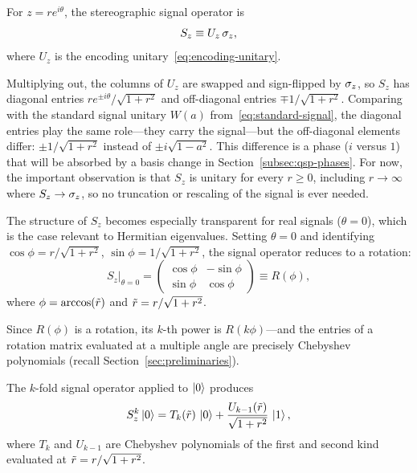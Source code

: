 \begin{definition}
	\label{def:signal-operator}
	For $z = re^{i\theta}$, the stereographic signal operator is
	\begin{equation}
		S_z \equiv U_z\,\sigma_z,
		\label{eq:signal-operator}
	\end{equation}
	where $U_z$ is the encoding unitary~\eqref{eq:encoding-unitary}.
\end{definition}

Multiplying out, the columns of $U_z$ are swapped and
sign-flipped by $\sigma_z$, so $S_z$ has diagonal entries
$re^{\pm i\theta}/\sqrt{1+r^2}$ and off-diagonal entries
$\mp 1/\sqrt{1+r^2}$.  Comparing with the standard signal
unitary $W(a)$ from~\eqref{eq:standard-signal}, the diagonal
entries play the same role---they carry the signal---but the
off-diagonal elements differ: $\pm 1/\sqrt{1+r^2}$ instead of
$\pm i\sqrt{1-a^2}$.  This difference is a phase ($i$ versus
$1$) that will be absorbed by a basis change in
Section~\ref{subsec:qsp-phases}.  For now, the important
observation is that $S_z$ is unitary for every $r \geq 0$,
including $r \to \infty$ where $S_z \to \sigma_z$, so no
truncation or rescaling of the signal is ever needed.

The structure of $S_z$ becomes especially transparent for real
signals ($\theta = 0$), which is the case relevant to
Hermitian eigenvalues.  Setting $\theta = 0$ and identifying
$\cos\phi = r/\sqrt{1+r^2}$, $\sin\phi = 1/\sqrt{1+r^2}$,
the signal operator reduces to a rotation:
\begin{equation}
	S_z\big|_{\theta=0} = \begin{pmatrix} \cos\phi & -\sin\phi \\ \sin\phi & \cos\phi \end{pmatrix} \equiv R(\phi),
	\label{eq:rotation-form}
\end{equation}
where $\phi = \arccos(\tilde{r})$ and $\tilde{r} = r/\sqrt{1+r^2}$.

Since $R(\phi)$ is a rotation, its $k$-th power is
$R(k\phi)$---and the entries of a rotation matrix evaluated at
a multiple angle are precisely Chebyshev polynomials (recall
Section~\ref{sec:preliminaries}).

\begin{theorem}
	\label{thm:chebyshev}
	The $k$-fold signal operator applied to $\ket{0}$ produces
	\begin{equation}
		S_z^k\ket{0} = T_k(\tilde{r})\,\ket{0} + \frac{U_{k-1}(\tilde{r})}{\sqrt{1+r^2}}\,\ket{1},
		\label{eq:chebyshev-state}
	\end{equation}
	where $T_k$ and $U_{k-1}$ are Chebyshev polynomials of the first and second kind evaluated at $\tilde{r} = r/\sqrt{1+r^2}$.
\end{theorem}

